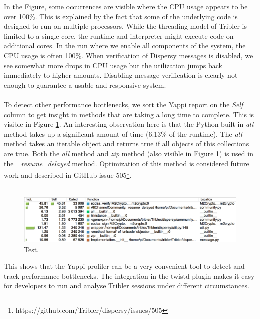 In the Figure, some occurrences are visible where the CPU usage appears to be over 100\%. This is explained by the fact that some of the underlying code is designed to run on multiple processors. While the threading model of Tribler is limited to a single core, the runtime and interpreter might execute code on additional cores. In the run where we enable all components of the system, the CPU usage is often 100\%. When verification of Dispersy messages is disabled, we see somewhat more drops in CPU usage but the utilization jumps back immediately to higher amounts. Disabling message verification is clearly not enough to guarantee a usable and responsive system.\\\\
To detect other performance bottlenecks, we sort the Yappi report on the \emph{Self} column to get insight in methods that are taking a long time to complete. This is visible in Figure \ref{fig:yappi_breakdown_self}. An interesting observation here is that the Python built-in \emph{all} method takes up a significant amount of time (6.13\% of the runtime). The \emph{all} method takes an iterable object and returns true if all objects of this collections are true. Both the \emph{all} method and \emph{zip} method (also visible in Figure \ref{fig:yappi_breakdown_self}) is used in the \emph{\_resume\_delayed} method. Optimization of this method is considered future work and described in GitHub issue 505\footnote{https://github.com/Tribler/dispersy/issues/505}.\\\\

\begin{figure}[!h]
	\centering
	\includegraphics[width=0.9\columnwidth]{images/experiments/yappi_breakdown_self}
	\caption{Test.}
	\label{fig:yappi_breakdown_self}
\end{figure}

This shows that the Yappi profiler can be a very convenient tool to detect and track performance bottlenecks. The integration in the twistd plugin makes it easy for developers to run and analyse Tribler sessions under different circumstances.

